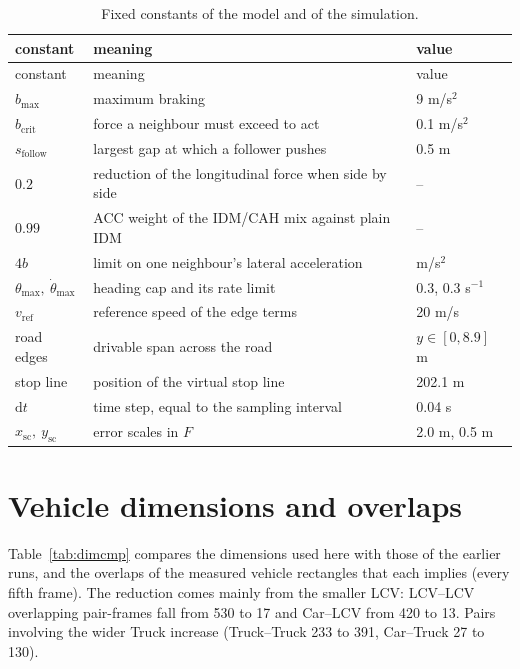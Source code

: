 \documentclass[11pt]{article}
\begin{document}
\begin{longtable}{@{}lp{9.5cm}l@{}}
\caption{Fixed constants of the model and of the simulation.}\label{tab:const}\\
\toprule constant & meaning & value\\\midrule\endfirsthead
\toprule constant & meaning & value\\\midrule\endhead
$b_{\max}$ & maximum braking & 9 m/s$^2$\\
$b_{\mathrm{crit}}$ & force a neighbour must exceed to act & 0.1 m/s$^2$\\
$s_{\mathrm{follow}}$ & largest gap at which a follower pushes & 0.5 m\\
$0.2$ & reduction of the longitudinal force when side by side & --\\
$0.99$ & ACC weight of the IDM/CAH mix against plain IDM & --\\
$4b$ & limit on one neighbour's lateral acceleration & m/s$^2$\\
$\theta_{\max},\ \dot\theta_{\max}$ & heading cap and its rate limit & 0.3, 0.3 s$^{-1}$\\
$v_{\mathrm{ref}}$ & reference speed of the edge terms & 20 m/s\\
road edges & drivable span across the road & $y\in[0,8.9]$ m\\
stop line & position of the virtual stop line & 202.1 m\\
$\mathrm{d}t$ & time step, equal to the sampling interval & 0.04 s\\
$x_{\mathrm{sc}},\ y_{\mathrm{sc}}$ & error scales in $F$ & 2.0 m, 0.5 m\\
\bottomrule
\end{longtable}

\section{Vehicle dimensions and overlaps}
\label{app:dims}
Table~\ref{tab:dimcmp} compares the dimensions used here with those of the
earlier runs, and the overlaps of the measured vehicle rectangles that each
implies (every fifth frame). The reduction comes mainly from the smaller LCV:
LCV--LCV overlapping pair-frames fall from 530 to 17 and Car--LCV from 420 to
13. Pairs involving the wider Truck increase (Truck--Truck 233 to 391, Car--Truck
27 to 130).
\end{document}
